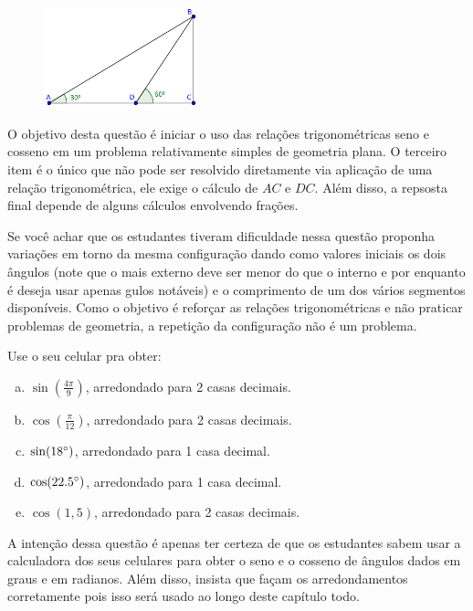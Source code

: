 \documentclass[main_estudante.tex]{subfiles}
\begin{document}
\begin{figure}[h]
\centering
\includegraphics[width=0.4\textwidth]{./img/c4q1.png}
\end{figure}

O objetivo desta questão é iniciar o uso das relações trigonométricas seno e cosseno em um problema relativamente simples de geometria plana. O terceiro item é o único que não pode ser resolvido diretamente via aplicação de uma relação trigonométrica, ele exige o cálculo de $AC$ e $DC$. Além disso, a repsosta final depende de alguns cálculos envolvendo frações.

Se você achar que os estudantes tiveram dificuldade nessa questão proponha variações em torno da mesma configuração dando como valores iniciais os dois ângulos (note que o mais externo deve ser menor do que o interno e por enquanto é deseja usar apenas gulos notáveis) e o comprimento de um dos vários segmentos disponíveis. Como o objetivo é reforçar as relações trigonométricas e não praticar problemas de geometria, a repetição da configuração não é um problema.

\begin{questao}
Use o seu celular pra obter:
\begin{enumerate}[a)]
\item $\sin(\frac{4\pi}{9})$, arredondado para 2 casas decimais.
\item $\cos(\frac{\pi}{12})$, arredondado para 2 casas decimais.
\item $\sin(18\degree)$, arredondado para 1 casa decimal.
\item $\cos(22.5\degree)$, arredondado para 1 casa decimal.
\item $\cos(1,5)$, arredondado para 2 casas decimais.
\end{enumerate}
\end{questao}

A intenção dessa questão é apenas ter certeza de que os estudantes sabem usar a calculadora dos seus celulares para obter o seno e o cosseno de ângulos dados em graus e em radianos. Além disso, insista que façam os arredondamentos corretamente pois isso será usado ao longo deste capítulo todo.
\end{document}
